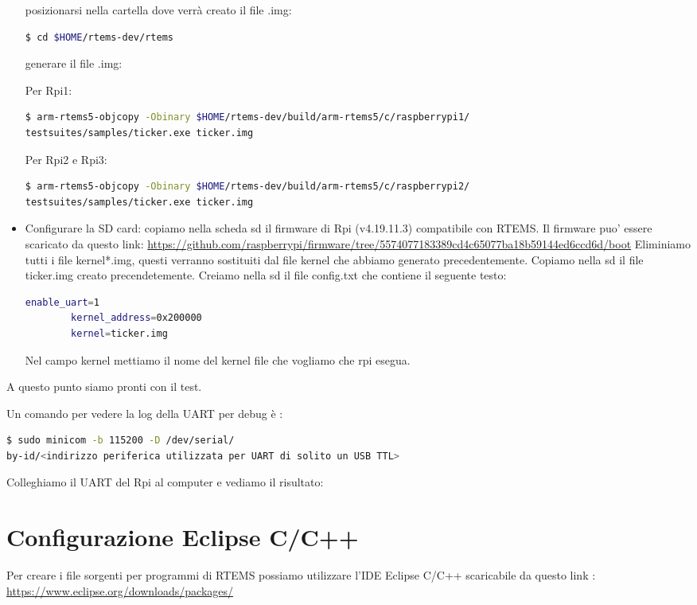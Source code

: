 \documentclass[10pt, a4paper]{article}
\begin{document}
\begin{flushleft}
\begin{itemize}
posizionarsi nella cartella dove verrà creato il file .img:
\begin{lstlisting}[language=bash] 
$ cd $HOME/rtems-dev/rtems 
\end{lstlisting}		

generare il file .img:

Per Rpi1: 
\begin{lstlisting}[language=bash] 
$ arm-rtems5-objcopy -Obinary $HOME/rtems-dev/build/arm-rtems5/c/raspberrypi1/ 
testsuites/samples/ticker.exe ticker.img
\end{lstlisting}
Per Rpi2 e Rpi3: 
\begin{lstlisting}[language=bash ] 
$ arm-rtems5-objcopy -Obinary $HOME/rtems-dev/build/arm-rtems5/c/raspberrypi2/
testsuites/samples/ticker.exe ticker.img
\end{lstlisting}
\item Configurare la SD card:
copiamo nella scheda sd il firmware di Rpi (v4.19.11.3) compatibile con RTEMS. 
Il firmware puo' essere scaricato da questo link: 
\url{https://github.com/raspberrypi/firmware/tree/5574077183389cd4c65077ba18b59144ed6ccd6d/boot}
Eliminiamo tutti i file kernel*.img, questi verranno sostituiti dal file 
kernel che abbiamo generato precedentemente.
Copiamo nella sd il file ticker.img creato precendetemente.
Creiamo nella sd il file config.txt che contiene il seguente testo:
\begin{lstlisting}[language=bash ] 
		enable_uart=1
		kernel_address=0x200000
 		kernel=ticker.img 
\end{lstlisting}
Nel campo kernel mettiamo il nome del kernel file che vogliamo che rpi esegua.
\end{itemize}
	 	 
A questo punto siamo pronti con il test.

Un comando per vedere la log della UART per debug è :
\begin{lstlisting}[language=bash] 
$ sudo minicom -b 115200 -D /dev/serial/
by-id/<indirizzo periferica utilizzata per UART di solito un USB TTL>
\end{lstlisting}

Colleghiamo il UART del Rpi al computer e vediamo il risultato:

\newpage
\section{Configurazione Eclipse C/C++} 
Per creare i file sorgenti per programmi di RTEMS possiamo utilizzare l'IDE Eclipse C/C++ scaricabile da questo link :
\url{https://www.eclipse.org/downloads/packages/}



\end{flushleft}
\end{document}
